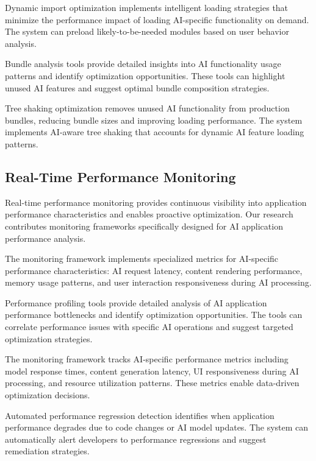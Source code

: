 Dynamic import optimization implements intelligent loading strategies that minimize the performance impact of loading AI-specific functionality on demand. The system can preload likely-to-be-needed modules based on user behavior analysis.

Bundle analysis tools provide detailed insights into AI functionality usage patterns and identify optimization opportunities. These tools can highlight unused AI features and suggest optimal bundle composition strategies.

Tree shaking optimization removes unused AI functionality from production bundles, reducing bundle sizes and improving loading performance. The system implements AI-aware tree shaking that accounts for dynamic AI feature loading patterns.

\subsection*{Real-Time Performance Monitoring}

Real-time performance monitoring provides continuous visibility into application performance characteristics and enables proactive optimization. Our research contributes monitoring frameworks specifically designed for AI application performance analysis.

The monitoring framework implements specialized metrics for AI-specific performance characteristics: AI request latency, content rendering performance, memory usage patterns, and user interaction responsiveness during AI processing.

Performance profiling tools provide detailed analysis of AI application performance bottlenecks and identify optimization opportunities. The tools can correlate performance issues with specific AI operations and suggest targeted optimization strategies.

\begin{infobox}[title=Monitoring Metrics]
The monitoring framework tracks AI-specific performance metrics including model response times, content generation latency, UI responsiveness during AI processing, and resource utilization patterns. These metrics enable data-driven optimization decisions.
\end{infobox}

Automated performance regression detection identifies when application performance degrades due to code changes or AI model updates. The system can automatically alert developers to performance regressions and suggest remediation strategies.

